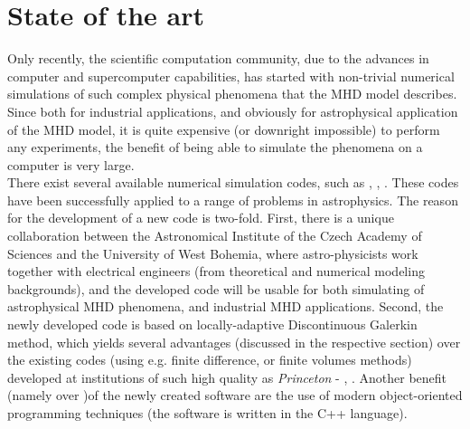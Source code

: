 \section{State of the art}
Only recently, the scientific computation community, due to the advances in computer and supercomputer capabilities, has started with non-trivial numerical simulations of such complex physical phenomena that the MHD model describes. Since both for industrial applications, and obviously for astrophysical application of the MHD model, it is quite expensive (or downright impossible) to perform any experiments, the benefit of being able to simulate the phenomena on a computer is very large.\\
There exist several available numerical simulation codes, such as \cite{athena}, \cite{zeus}, \cite{ramses}. These codes have been successfully applied to a range of problems in astrophysics. The reason for the development of a new code is two-fold. First, there is a unique collaboration between the Astronomical Institute of the Czech Academy of Sciences and the University of West Bohemia, where astro-physicists work together with electrical engineers (from theoretical and numerical modeling backgrounds), and the developed code will be usable for both simulating of astrophysical MHD phenomena, and industrial MHD applications. Second, the newly developed code is based on locally-adaptive Discontinuous Galerkin method, which yields several advantages (discussed in the respective section) over the existing codes (using e.g. finite difference, or finite volumes methods) developed at institutions of such high quality as \emph{Princeton} - \cite{athena}, \cite{zeus}. Another benefit (namely over \cite{zeus})of the newly created software are the use of modern object-oriented programming techniques (the software is written in the C++ language).